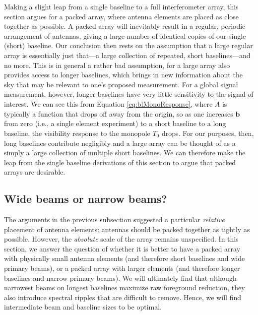 \documentclass[twocolumn,apj,numberedappendix]{emulateapj}
\newcommand{\M}{\mathbf{M}}
\newcommand{\acl}[1]{{\color{red} \textbf{[ACL:  #1]}}}
\begin{document}
Making a slight leap from a single baseline to a full interferometer array, this section argues for a packed array, where antenna elements are placed as close together as possible. A packed array will inevitably result in a regular, periodic arrangement of antennas, giving a large number of identical copies of our single (short) baseline. Our conclusion then rests on the assumption that a large regular array is essentially just that---a large collection of repeated, short baselines---and no more. This is in general a rather bad assumption, for a large array also provides access to longer baselines, which brings in new information about the sky that may be relevant to one's proposed measurement. For a global signal measurement, however, longer baselines have very little sensitivity to the signal of interest. We can see this from Equation \eqref{eq:blMonoResponse}, where $\widetilde{A}$ is typically a function that drops off away from the origin, so as one increases $\mathbf{b}$ from zero (i.e., a single element experiment) to a short baseline to a long baseline, the visibility response to the monopole $T_0$ drops. For our purposes, then, long baselines contribute negligibly and a large array can be thought of as a simply a large collection of multiple short baselines. We can therefore make the leap from the single baseline derivations of this section to argue that packed arrays are desirable.
%

\subsection{Wide beams or narrow beams?}
\label{sec:beamSize}

The arguments in the previous subsection suggested a particular \emph{relative} placement of antenna elements: antennas should be packed together as tightly as possible. However, the \emph{absolute} scale of the array remains unspecified. In this section, we answer the question of whether it is better to have a packed array with physically small antenna elements (and therefore short baselines and wide primary beams), or a packed array with larger elements (and therefore longer baselines and narrow primary beams). We will ultimately find that although narrowest beams on longest baselines maximize raw foreground reduction, they also introduce spectral ripples that are difficult to remove. Hence, we will find intermediate beam and baseline sizes to be optimal.
\end{document}
